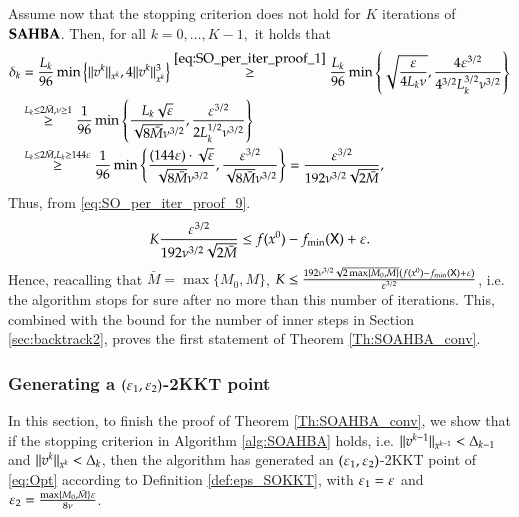 Assume now that the stopping criterion does not hold for $K$ iterations of $\operatorname{\mathbf{SAHBA}}$. 
Then, for all $k=0,\ldots,K-1,$ it holds that 
\begin{align}
\delta_k &= \frac{L_k}{96} \min\left\{\lVert v^{k}\rVert_{x^{k}}, 4\lVert v^{k}\rVert_{x^{k}}^3 \right\} 
\stackrel{\eqref{eq:SO_per_iter_proof_1}}{\geq} \frac{L_k}{96} \min\left\{  \sqrt{\frac{\varepsilon}{4L_{k}\nu}} ,  \frac{4 \varepsilon^{3/2}}{4^{3/2}L_{k}^{3/2}\nu^{3/2}}  \right\} \notag \\
&\stackrel{L_k \leq 2\bar{M}, \nu \geq 1}{\geq}  \frac{1}{96} \min\left\{  \frac{L_k \sqrt{\varepsilon}}{\sqrt{8\bar{M}} \nu^{3/2}} ,  \frac{ \varepsilon^{3/2}}{2 L_{k}^{1/2}\nu^{3/2}}  \right\}  \notag \\
&\stackrel{L_k \leq 2\bar{M},L_k \geq 144  \varepsilon}{\geq} \frac{1}{96} \min\left\{ \frac{(144 \varepsilon) \cdot \sqrt{\varepsilon}}{\sqrt{8\bar{M}} \nu^{3/2}} ,  \frac{ \varepsilon^{3/2}}{\sqrt{8\bar{M}}\nu^{3/2}}  \right\}  = \frac{\varepsilon^{3/2}}{192 \nu^{3/2} \sqrt{2\bar{M}} },
\end{align}
Thus, from \eqref{eq:SO_per_iter_proof_9}.
\begin{align*}
K \frac{\varepsilon^{3/2}}{192 \nu^{3/2} \sqrt{2\bar{M}} } \leq f(x^{0}) - f_{\min}(\mathsf{X}) + \varepsilon. 
\end{align*}
Hence, reacalling that $\bar{M}=\max\{M_0,M\}$, $K \leq \frac{192 \nu^{3/2} \sqrt{2\max\{M_0,M\}}(f(x^{0}) - f_{\min}(\mathsf{X})+ \varepsilon)}{\varepsilon^{3/2} }$,
i.e. the algorithm stops for sure after no more than this number of iterations. This, combined with the bound for the number of inner steps in Section \ref{sec:backtrack2}, proves the first statement of Theorem \ref{Th:SOAHBA_conv}.


\subsubsection{Generating a $(\varepsilon_{1},\varepsilon_{2})$-2KKT point}
In this section, to finish the proof of Theorem \ref{Th:SOAHBA_conv}, we show that if the stopping criterion in Algorithm \ref{alg:SOAHBA} holds, i.e. $\lVert v^{k-1}\rVert_{x^{k-1}} < \Delta_{k-1}$ and $\lVert v^{k}\rVert_{x^{k}} < \Delta_{k}$, then the algorithm has generated an $(\varepsilon_{1},\varepsilon_{2})$-2KKT point of \eqref{eq:Opt} according to Definition \ref{def:eps_SOKKT}, with $\varepsilon_{1}=\varepsilon$ and $\varepsilon_{2}=\frac{\max\{M_{0},\bar{M}\}\varepsilon}{8\nu}$.

